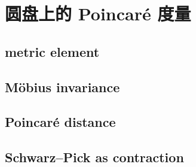 \section{圆盘上的 Poincaré 度量}
\label{b3:sec:1301}


\subsection{metric element}
\label{b3:subsec:130101}

\subsection{Möbius invariance}
\label{b3:subsec:130102}

\subsection{Poincaré distance}
\label{b3:subsec:130103}

\subsection{Schwarz–Pick as contraction}
\label{b3:subsec:130104}


